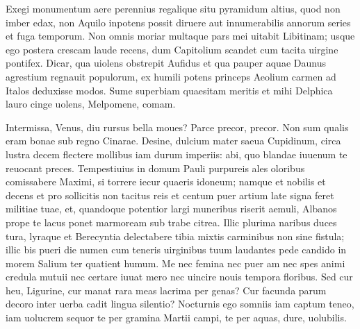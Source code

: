 \documentclass{book}
\newenvironment {carmen} [1] [\relax] 
  {\Titulus \Versus \incipit*\numerus{1}#1}
  {\endVersus}
\newcommand {\Alcaic}    {\Forma \strophae {0 \poena 01 \poena 2}}
\newcommand {\GlycAscl}  {\Forma \strophae {2 \poena 0}}
\begin{document}
\begin{carmen}[\Alcaic]
\end{carmen}

\begin{carmen}


Exegi monumentum aere perennius
 regalique situ pyramidum altius,
 quod non imber edax, non Aquilo inpotens
 possit diruere aut innumerabilis
 annorum series et fuga temporum.               
 Non omnis moriar multaque pars mei
 uitabit Libitinam; usque ego postera
 crescam laude recens, dum Capitolium
 scandet cum tacita uirgine pontifex.
 Dicar, qua uiolens obstrepit Aufidus               
 et qua pauper aquae Daunus agrestium
 regnauit populorum, ex humili potens
 princeps Aeolium carmen ad Italos
 deduxisse modos. Sume superbiam
 quaesitam meritis et mihi Delphica               
 lauro cinge uolens, Melpomene, comam. 

\end{carmen}
 
\desinitLiber

\Liber

\begin{carmen}[\GlycAscl]

     Intermissa, Venus, diu
 rursus bella moues? Parce precor, precor.
      Non sum qualis eram bonae
 sub regno Cinarae. Desine, dulcium
      mater saeua Cupidinum,               
 circa lustra decem flectere mollibus
      iam durum imperiis: abi,
 quo blandae iuuenum te reuocant preces.
      Tempestiuius in domum
 Pauli purpureis ales oloribus               
      comissabere Maximi,
 si torrere iecur quaeris idoneum;
      namque et nobilis et decens
 et pro sollicitis non tacitus reis
      et centum puer artium               
 late signa feret militiae tuae,
      et, quandoque potentior
 largi muneribus riserit aemuli,
      Albanos prope te lacus
 ponet marmoream sub trabe citrea.               
      Illic plurima naribus
 duces tura, lyraque et Berecyntia
      delectabere tibia
 mixtis carminibus non sine fistula;
      illic bis pueri die
 numen cum teneris uirginibus tuum               
      laudantes pede candido
 in morem Salium ter quatient humum.
      Me nec femina nec puer
 am nec spes animi credula mutuii               
      nec certare iuuat mero
 nec uincire nouis tempora floribus.
      Sed cur heu, Ligurine, cur
 manat rara meas lacrima per genas?
      Cur facunda parum decoro               
 inter uerba cadit lingua silentio?
      Nocturnis ego somniis
 iam captum teneo, iam uolucrem sequor
      te per gramina Martii
 campi, te per aquas, dure, uolubilis.               

\end{carmen}
\end{document}
